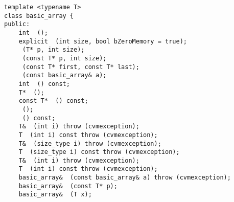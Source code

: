 \noindent%
\verb"template <typename T>"\\
\verb"class basic_array {"\\
\verb"public:"\\
\verb"    int "\verb" ();"\\
\verb"    explicit "\verb" (int size, bool bZeroMemory = true);"\\
\verb"    "\verb" (T* p, int size);"\\
\verb"    "\verb" (const T* p, int size);"\\
\verb"    "\verb" (const T* first, const T* last);"\\
\verb"    "\verb" (const basic_array& a);"\\
\verb"    int "\verb" () const;"\\
\verb"    T* "\verb" ();"\\
\verb"    const T* "\verb" () const;"\\
\verb"    "\verb" ();"\\
\verb"    "\verb" () const;"\\
\verb"    T& "\verb" (int i) throw (cvmexception);"\\
\verb"    T "\verb" (int i) const throw (cvmexception);"\\
\verb"    T& "\verb" (size_type i) throw (cvmexception);"\\
\verb"    T "\verb" (size_type i) const throw (cvmexception);"\\
\verb"    T& "\verb" (int i) throw (cvmexception);"\\
\verb"    T "\verb" (int i) const throw (cvmexception);"\\
\verb"    basic_array& "\verb" (const basic_array& a) throw (cvmexception);"\\
\verb"    basic_array& "\verb" (const T* p);"\\
\verb"    basic_array& "\verb" (T x);"\\
